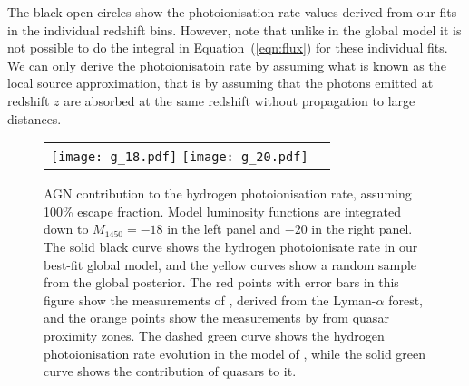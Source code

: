 \documentclass[a4paper,fleqn,usenatbib]{mnras}
\begin{document}
The black open circles show the photoionisation rate values derived
from our fits in the individual redshift bins.  However, note that
unlike in the global model it is not possible to do the integral in
Equation~(\ref{eqn:flux}) for these individual fits.  We can only
derive the photoionisatoin rate by assuming what is known as the local
source approximation, that is by assuming that the photons emitted at
redshift $z$ are absorbed at the same redshift without propagation to
large distances.

\begin{figure*}
  \begin{center}
    \begin{tabular}{cc}
    \texttt{[image: g\_18.pdf]}
    \texttt{[image: g\_20.pdf]}
    \end{tabular}
  \end{center}
  \caption{AGN contribution to the hydrogen photoionisation rate,
    assuming 100\% escape fraction.  Model luminosity functions are
    integrated down to $M_{1450}=-18$ in the left panel and $-20$ in
    the right panel.  The solid black curve shows the hydrogen
    photoionisate rate in our best-fit global model, and the yellow
    curves show a random sample from the global posterior.  The red
    points with error bars in this figure show the measurements of
    \citet{2013MNRAS.436.1023B}, derived from the Lyman-$\alpha$
    forest, and the orange points show the measurements by
    \citet{2011MNRAS.412.2543C} from quasar proximity zones.  The
    dashed green curve shows the hydrogen photoionisation rate
    evolution in the model of \citet{2012ApJ...746..125H}, while the
    solid green curve shows the contribution of quasars to it. }
  \label{fig:gammapi}
\end{figure*}
\end{document}
